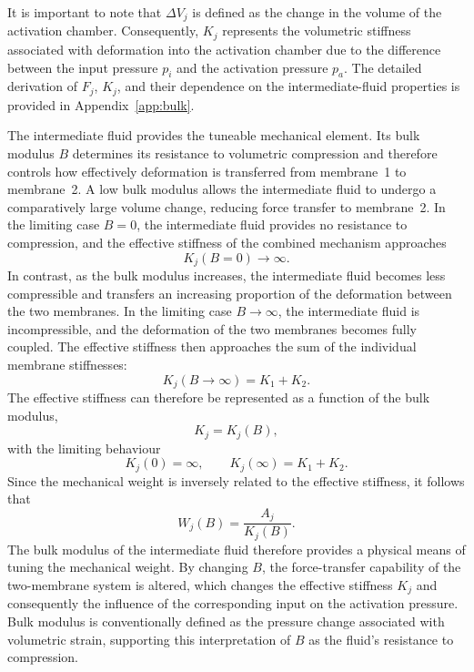 \documentclass[11pt,a4paper]{article}
\numberwithin{equation}{section}
\begin{document}
It is important to note that $\Delta V_j$ is defined as the change in the volume of the activation chamber.
Consequently, $K_j$ represents the volumetric stiffness associated with deformation into the activation chamber due
to the difference between the input pressure $p_i$ and the activation pressure $p_a$. The detailed derivation of
$F_j$, $K_j$, and their dependence on the intermediate-fluid properties is provided in Appendix~\ref{app:bulk}.

The intermediate fluid provides the tuneable mechanical element. Its bulk modulus $B$ determines its resistance to
volumetric compression and therefore controls how effectively deformation is transferred from membrane~1 to
membrane~2. A low bulk modulus allows the intermediate fluid to undergo a comparatively large volume change,
reducing force transfer to membrane~2. In the limiting case $B = 0$, the intermediate fluid provides no resistance to
compression, and the effective stiffness of the combined mechanism approaches
\begin{equation}
  K_j(B = 0) \rightarrow \infty .
  \label{eq:k-b0}
\end{equation}
In contrast, as the bulk modulus increases, the intermediate fluid becomes less compressible and transfers an
increasing proportion of the deformation between the two membranes. In the limiting case $B \rightarrow \infty$, the
intermediate fluid is incompressible, and the deformation of the two membranes becomes fully coupled. The effective
stiffness then approaches the sum of the individual membrane stiffnesses:
\begin{equation}
  K_j(B \rightarrow \infty) = K_1 + K_2 .
  \label{eq:k-binf}
\end{equation}
The effective stiffness can therefore be represented as a function of the bulk modulus,
\begin{equation}
  K_j = K_j(B),
  \label{eq:k-of-b}
\end{equation}
with the limiting behaviour
\begin{equation}
  K_j(0) = \infty, \qquad K_j(\infty) = K_1 + K_2 .
  \label{eq:k-limits}
\end{equation}
Since the mechanical weight is inversely related to the effective stiffness, it follows that
\begin{equation}
  W_j(B) = \frac{A_j}{K_j(B)} .
  \label{eq:weight-of-b}
\end{equation}
The bulk modulus of the intermediate fluid therefore provides a physical means of tuning the mechanical weight. By
changing $B$, the force-transfer capability of the two-membrane system is altered, which changes the effective
stiffness $K_j$ and consequently the influence of the corresponding input on the activation pressure. Bulk modulus
is conventionally defined as the pressure change associated with volumetric strain, supporting this interpretation of
$B$ as the fluid's resistance to compression.
\end{document}
